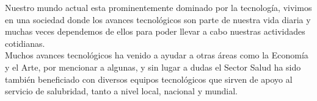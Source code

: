 \documentclass[12pt,letterpaper,titlepage]{article}
\begin{document}


Nuestro mundo actual esta prominentemente dominado por la tecnología, vivimos en una sociedad donde los avances tecnológicos son parte de nuestra vida diaria y muchas veces dependemos de ellos para poder llevar a cabo nuestras actividades cotidianas.\\

Muchos avances tecnológicos ha venido a ayudar a otras áreas como la Economía y el Arte, por mencionar a algunas, y sin lugar a dudas el Sector Salud ha sido también beneficiado con diversos equipos tecnológicos que sirven de apoyo al servicio de salubridad, tanto a nivel local, nacional y mundial.\\
\end{document}
